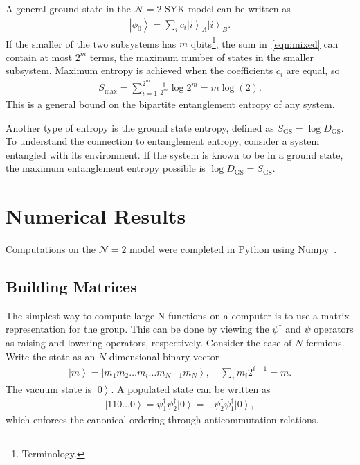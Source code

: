 \documentclass[12pt]{article} %
\renewcommand{\cal}{\mathcal}
\renewcommand{\th}[1]{\frac{1}{#1}}
\newcommand{\ket}[1]{\left|#1\right\rangle}
\begin{document}
A general ground state in the $\cal N=2$ SYK model can be written as 
\begin{align}
\ket{\phi_0} = \sum_ic_i\ket{i}_A\ket{i}_B. \label{eqn:mixed}
\end{align}
If the smaller of the two subsystems has $m$ qbits\footnote{Terminology.}, the sum in~\ref{eqn:mixed} can contain at most $2^m$ terms, the maximum number of states in the smaller subsystem. Maximum entropy is achieved when the coefficients $c_i$ are equal, so 
\begin{align}
S_\text{max} = \sum_{i=1}^{2^m}\th{2^m}\log 2^m = m\log(2).\label{eqn:thermal}
\end{align}
This is a general bound on the bipartite entanglement entropy of any system.

Another type of entropy is the ground state entropy, defined as $S_\text{GS} = \log D_\text{GS}$. To understand the connection to entanglement entropy, consider a system entangled with its environment. If the system is known to be in a ground state, the maximum entanglement entropy possible is $\log D_\text{GS} = S_\text{GS}$.

\section{Numerical Results} \label{sec:numeric}

Computations on the $\cal N=2$ model were completed in Python using Numpy~\cite{vander11}.

\subsection{Building Matrices}\emph{} \label{sub:build_mat}

The simplest way to compute large-N functions on a computer is to use a matrix representation for the group. This can be done by viewing the $\psi^\dag$ and $\psi$ operators as raising and lowering operators, respectively. Consider the case of $N$ fermions. Write the state as an $N$-dimensional binary vector
\begin{align}
\ket{m} = \ket{m_1m_2\dots m_i\dots m_{N-1}m_N}, \quad\sum_im_i2^{i-1} =
	m.\label{eqn:2Nstate}
\end{align}
The vacuum state is $\ket{0}$. A populated state can be written as
\begin{align}
\ket{110\dots 0} = \psi^\dag_1\psi^\dag_2 \ket{0} =-\psi^\dag_2\psi^\dag_1\ket{0},
\end{align}
which enforces the canonical ordering through anticommutation relations. 
\end{document}
